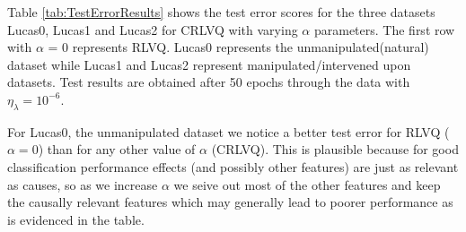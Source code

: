 \documentclass{esannV2}
\begin{document}
Table \ref{tab:TestErrorResults} shows the test error scores for the three datasets Lucas0, Lucas1 and Lucas2 for CRLVQ with varying $\alpha$ parameters. The first row with $\alpha$ = 0 represents RLVQ. Lucas0 represents the unmanipulated(natural) dataset while Lucas1 and Lucas2 represent manipulated/intervened upon datasets. Test results are obtained after 50 epochs through the data with $\eta_\lambda = 10^{-6}$.
\begin{table}[!ht]
	\centering
	\caption{Test Error results for RLVQ and CRLVQ for the different datasets Lucas0, Lucas1 and Lucas2.}
	\label{tab:TestErrorResults}
\end{table} 

For Lucas0, the unmanipulated dataset we notice a better test error for RLVQ ($\alpha = 0$) than for any other value of $\alpha$ (CRLVQ). This is plausible because for good classification performance effects (and possibly other features) are just as relevant as causes, so as we increase $\alpha$ we seive out most of the other features and keep the causally relevant features which may generally lead to poorer performance as is evidenced in the table.
\end{document}
